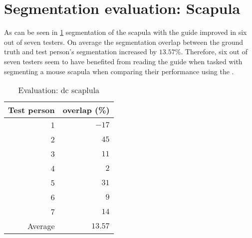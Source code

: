 \section{Segmentation evaluation: Scapula}\label{s:seg-eval-scapula}
As can be seen in \cref{tab:scapula-overlap} segmentation of the scapula with the guide improved in six out of seven testers.
On average the segmentation overlap between the ground truth and test person's segmentation increased by $13.57\%$.
Therefore, six out of seven testers seem to have benefited from reading the guide when tasked with segmenting a mouse scapula when comparing their performance using the .
\begin{table}[ht]
	\begin{center}
		\begin{tabular}{r r}
			\textbf{Test person} & \textbf{overlap (\%)} \\
			\hline
			1                    & $-17$                 \\
			2                    & $45$                  \\
			3                    & $11$                  \\
			4                    & $2$                   \\
			5                    & $31$                  \\
			6                    & $9$                   \\
			7                    & $14$                  \\
			\hline
			Average              & $13.57$               \\
		\end{tabular}
		\caption{Evaluation: \acrshort{dc} scaplula}\label{tab:scapula-overlap}
	\end{center}
\end{table}

